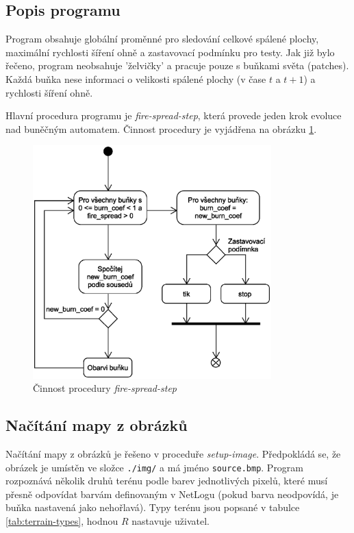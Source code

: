 \documentclass[11pt,a4paper]{scrartcl}
\begin{document}
	
	\subsection{Popis programu}
	Program obsahuje globální proměnné pro sledování celkové spálené plochy, maximální rychlosti šíření ohně a zastavovací podmínku pro testy. Jak již bylo řečeno, program neobsahuje 'želvičky' a pracuje pouze s buňkami světa (patches). Každá buňka nese informaci o velikosti spálené plochy (v čase $t$ a $t+1$) a rychlosti šíření ohně.
	
	Hlavní procedura programu je \textit{fire-spread-step}, která provede jeden krok evoluce nad buněčným automatem. Činnost procedury je vyjádřena na obrázku \ref{fig:go-procedure}. 
	
	\begin{figure}[H]
		\centering
		\includegraphics[height=9cm]{go-flowchart}
		\caption{Činnost procedury \textit{fire-spread-step}}
		\label{fig:go-procedure}
	\end{figure}
	
	\subsection{Načítání mapy z obrázků}
	Načítání mapy z obrázků je řešeno v proceduře \textit{setup-image}. Předpokládá se, že obrázek je umístěn ve složce \verb|./img/| a má jméno \verb|source.bmp|. Program rozpoznává několik druhů terénu podle barev jednotlivých pixelů, které musí přesně odpovídat barvám definovaným v NetLogu (pokud barva neodpovídá, je buňka nastavená jako nehořlavá). Typy terénu jsou popsané v tabulce \ref{tab:terrain-types}, hodnou $R$ nastavuje uživatel.
	
\end{document}
